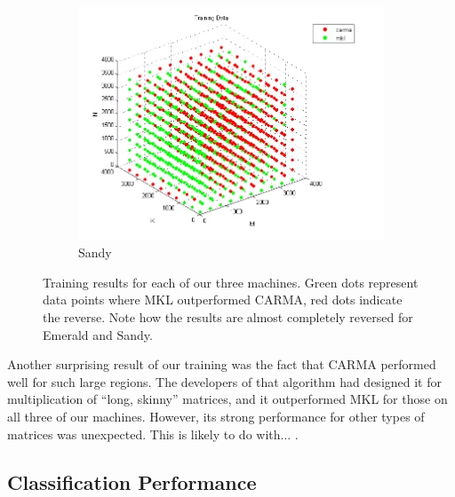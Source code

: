 \begin{figure}[t]
        \begin{subfigure}[t]{0.3\textwidth}
            \includegraphics[width=\textwidth]{figures/sandy_train.png}
            \caption{Sandy}
            \label{f:train_sandy}
        \end{subfigure}
        \caption{Training results for each of our three machines. Green dots represent data points where MKL outperformed CARMA, red dots indicate the reverse. Note how the results are almost completely reversed for Emerald and Sandy.}
    \label{fig:training}
\end{figure}

Another surprising result of our training was the fact that CARMA performed well for such large regions.
The developers of that algorithm had designed it for multiplication of ``long, skinny'' matrices, and it outperformed MKL for those on all three of our machines.
However, its strong performance for other types of matrices was unexpected.
This is likely to do with... .

\subsection{Classification Performance}
